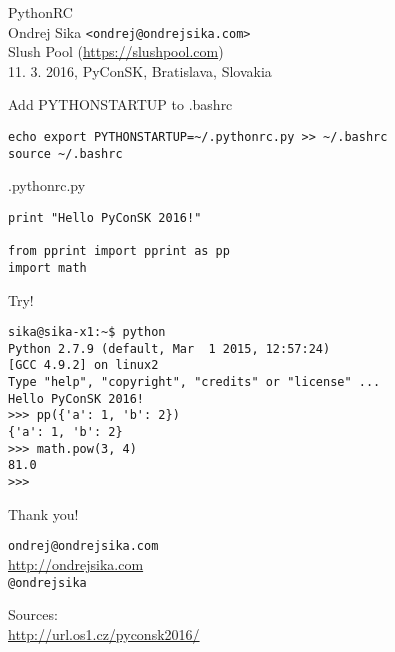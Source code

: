 \documentclass{beamer}
\begin{document}
\begin{frame}

    {\LARGE PythonRC}\\
    \vspace{7mm}
    {\Large Ondrej Sika \lstinline|<ondrej@ondrejsika.com>|}\\
    \vspace{7mm}
    {\large Slush Pool (\url{https://slushpool.com})}\\
    \vspace{7mm}
    11. 3. 2016, PyConSK, Bratislava, Slovakia\\

\end{frame}

\begin{frame}[fragile]

    {\LARGE Add PYTHONSTARTUP to .bashrc}\\

    \begin{verbatim}
echo export PYTHONSTARTUP=~/.pythonrc.py >> ~/.bashrc
source ~/.bashrc
    \end{verbatim}

\end{frame}

\begin{frame}[fragile]

    {\LARGE .pythonrc.py}\\

    \begin{verbatim}
print "Hello PyConSK 2016!"

from pprint import pprint as pp
import math
    \end{verbatim}

\end{frame}

\begin{frame}[fragile]

    {\LARGE Try!}\\

    \begin{verbatim}
sika@sika-x1:~$ python
Python 2.7.9 (default, Mar  1 2015, 12:57:24)
[GCC 4.9.2] on linux2
Type "help", "copyright", "credits" or "license" ...
Hello PyConSK 2016!
>>> pp({'a': 1, 'b': 2})
{'a': 1, 'b': 2}
>>> math.pow(3, 4)
81.0
>>>
    \end{verbatim}

\end{frame}

\begin{frame}

    {\LARGE Thank you!}\\

    \vspace{1cm}

    \texttt{ondrej@ondrejsika.com}\\
    \url{http://ondrejsika.com}\\
    \texttt{@ondrejsika}\\

    \vspace{1cm}

    Sources:\\
    \url{http://url.os1.cz/pyconsk2016/}
\end{frame}
\end{document}
